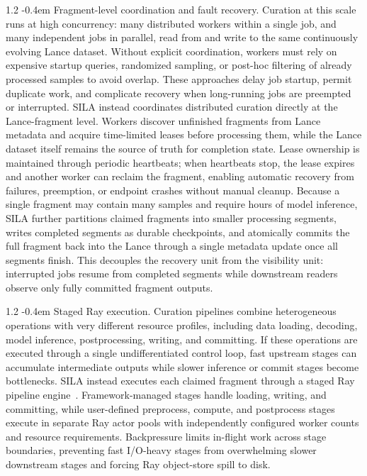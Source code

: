 \documentclass{llmxive}
\makeatletter
\providecommand{\paragraph}{  \@startsection{paragraph}{4}{\z@}    {1\baselineskip \@plus .2\baselineskip}    {-0.4em}    {\normalfont\normalsize\bfseries}}
\makeatother
\begin{document}
\paragraph{Fragment-level coordination and fault recovery.}
Curation at this scale runs at high concurrency: many distributed workers within a single job, and many independent jobs in parallel, read from and write to the same continuously evolving Lance dataset. Without explicit coordination, workers must rely on expensive startup queries, randomized sampling, or post-hoc filtering of already processed samples to avoid overlap. These approaches delay job startup, permit duplicate work, and complicate recovery when long-running jobs are preempted or interrupted. SILA instead coordinates distributed curation directly at the Lance-fragment level. Workers discover unfinished fragments from Lance metadata and acquire time-limited leases before processing them, while the Lance dataset itself remains the source of truth for completion state. Lease ownership is maintained through periodic heartbeats; when heartbeats stop, the lease expires and another worker can reclaim the fragment, enabling automatic recovery from failures, preemption, or endpoint crashes without manual cleanup. Because a single fragment may contain many samples and require hours of model inference, SILA further partitions claimed fragments into smaller processing segments, writes completed segments as durable checkpoints, and atomically commits the full fragment back into the Lance through a single metadata update once all segments finish. This decouples the recovery unit from the visibility unit: interrupted jobs resume from completed segments while downstream readers observe only fully committed fragment outputs.

\paragraph{Staged Ray execution.}
Curation pipelines combine heterogeneous operations with very different resource profiles, including data loading, decoding, model inference, postprocessing, writing, and committing. If these operations are executed through a single undifferentiated control loop, fast upstream stages can accumulate intermediate outputs while slower inference or commit stages become bottlenecks. SILA instead executes each claimed fragment through a staged Ray pipeline engine~\citep{moritz2018raydistributedframeworkemerging}. Framework-managed stages handle loading, writing, and committing, while user-defined preprocess, compute, and postprocess stages execute in separate Ray actor pools with independently configured worker counts and resource requirements. Backpressure limits in-flight work across stage boundaries, preventing fast I/O-heavy stages from overwhelming slower downstream stages and forcing Ray object-store spill to disk.
\end{document}
